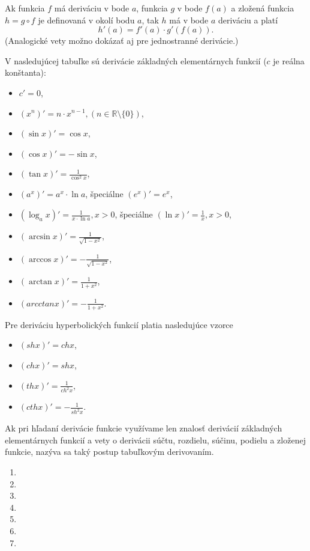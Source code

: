 \begin{veta}
Ak funkcia $f$ má deriváciu v bode $a$, funkcia $g$ v bode $f(a)$ a zložená funkcia $h=g \circ f$ je definovaná v okolí bodu $a$, tak $h$ má v bode $a$ deriváciu a platí $$h'(a)=f'(a)\cdot g'(f(a)).$$
(Analogické vety možno dokázať aj pre jednostranné derivácie.)
\end{veta}

V nasledujúcej tabuľke sú derivácie základných elementárnych funkcií ($c$ je reálna konštanta):
\begin{itemize}
\item $c'=0$,
\item $(x^n)'=n\cdot x^{n-1},(n \in \mathbb{R} \setminus \{0\})$,
\item $(\sin x)'=\cos x$,
\item $(\cos x)'=-\sin x$,
\item $(\tan x)'=\frac{1}{\cos^2 x}$,
\item $(a^x)'=a^x \cdot \ln a$, špeciálne $(e^x)'=e^x$,
\item $(\log_{a} x)'=\frac{1}{x\cdot \ln a},x>0$, špeciálne $(\ln x)'=\frac{1}{x},x>0$,
\item $(\arcsin x)'=\frac{1}{\sqrt{1-x^2}}$,
\item $(\arccos x)'=-\frac{1}{\sqrt{1-x^2}}$,
\item $(\arctan x)'=\frac{1}{1+x^2}$,
\item $(arcctan x)'=-\frac{1}{1+x^2}$.
\end{itemize}

Pre deriváciu hyperbolických funkcií platia nasledujúce vzorce
\begin{multicols}{2}
\begin{itemize}
   \item $(sh x)'=ch x$,
   \item $(ch x)'=sh x$,
   \item $(th x)'=\frac{1}{ch^2 x}$,
   \item $(cth x)'=-\frac{1}{sh^2 x}$.
\end{itemize}
\end{multicols}

Ak pri hľadaní derivácie funkcie využívame len znalosť derivácií základných elementárnych funkcií a vety o derivácii súčtu, rozdielu, súčinu, podielu a zloženej funkcie, nazýva sa taký postup tabuľkovým derivovaním.

\begin{enumerate}[resume]
	\item {}
	\item {}
	\item {}
	\item {}
	\item {}
	\item {}
	\item {}
\end{enumerate}

